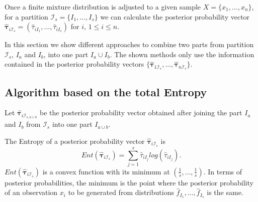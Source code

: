 \documentclass[10pt, a4paper]{article}
\newcommand{\m}[1]{\boldsymbol{#1}}
\begin{document}
Once a finite mixture distribution is adjusted to a given sample $X=\{x_1, \dots, x_n\}$, for a partition $\mathcal{I}_s = \{ I_1, \dots, I_s\}$ we can calculate the posterior probability vector   $\hat{\m\tau}_{i \mathcal{I}_s} = \left( \hat{\tau}_{i I_1} , \dots, \hat{\tau}_{i I_s}  \right)$ for $i$, $1 \leq i \leq n$.

In this section we show different approaches to combine two parts from partition $\mathcal{I}_s$, $I_a$ and $I_b$, into one part $I_a \cup I_b$. The shown methods only use the information contained in the posterior probability vectors $\{ \hat{\m\tau}_{1 \mathcal{I}_s},\dots, \hat{\m\tau}_{n \mathcal{I}_s} \}$.


\subsection*{Algorithm based on the total Entropy}



Let $\hat{\m \tau}_{i \mathcal{I}_{s, a \cup b}}$ be the posterior probability vector obtained  after joining the part $I_a$ and $I_b$ from $ \mathcal{I}_s$ into one part $I_{a \cup b}$. 

The Entropy of a posterior probability vector $\hat{\m \tau}_{i \mathcal{I}_s}$ is
\[
Ent( \hat{\m \tau}_{i \mathcal{I}_s} ) = \sum_{j=1}^s \hat{\tau}_{i I_j}  log(\hat{\tau}_{i I_j} ).
\]
$Ent( \hat{\m \tau}_{i \mathcal{I}_s} )$ is a convex function with its minimum at $(\frac{1}{s},\dots,\frac{1}{s})$. In terms of posterior probabilities, the minimum is the point where the posterior probability of an observation $x_i$ to be generated from distributions $\hat{f}_{I_1}, \dots, \hat{f}_{I_s}$ is the same.
\end{document}
